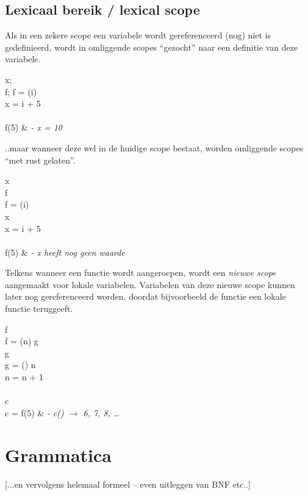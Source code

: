\subsection{Lexicaal bereik / lexical scope}

Als in een zekere scope een variabele wordt gereferenceerd (nog) niet is gedefinieerd, wordt in omliggende scopes ``gezocht'' naar een definitie van deze variabele.

	\begin{SyntaxExample}
		\N \VAR x; \\
		\N \VAR f;\; f = \FUN(i) \\
		\N \IN x = i + 5 \\
		\N \\
		\N f(5) & \textit{- x = 10}
	\end{SyntaxExample}

..maar wanneer deze wel in de huidige scope bestaat, worden omliggende scopes ``met rust gelaten''.

	\begin{SyntaxExample}
		\N \VAR x \\
		\N \VAR f \\
		\N f = \FUN(i) \\
		\N \IN \VAR x \\
		\N \IN x = i + 5 \\
		\N \\
		\N f(5) & \textit{- x heeft nog geen waarde}
	\end{SyntaxExample}

Telkens wanneer een functie wordt aangeroepen, wordt een \emph{nieuwe scope} aangemaakt voor lokale variabelen. Variabelen van deze nieuwe scope kunnen later nog gereferenceerd worden, doordat bijvoorbeeld de functie een lokale functie teruggeeft.

	\begin{SyntaxExample}
		\N \VAR f \\
		\N f = \FUN(n) \RETURNS g \\
		\N \IN \VAR g \\
		\N \IN g = \FUN() \RETURNS n \\
		\N \IN \IN n = n + 1 \\
		\N \\
		\N \VAR c \\
		\N c = f(5) & \textit{- c() $\rightarrow$ 6, 7, 8, \dots}
	\end{SyntaxExample}


\section{Grammatica}

[...en vervolgens helemaal formeel -- even uitleggen van BNF etc..]
